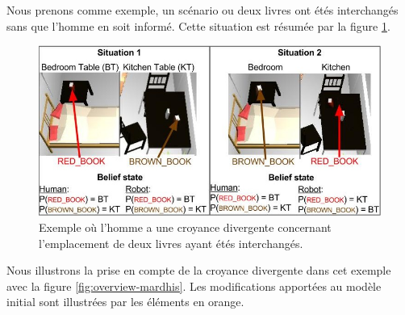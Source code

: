 \documentclass[a4paper,11pt,twoside]{StyleThese}
\begin{document}
Nous prenons comme exemple, un scénario ou deux livres ont étés interchangés sans que l'homme en soit informé.
Cette situation est résumée par la figure \ref{fig:dbexemple}.

\begin{figure}[ht!]
 \centering
  \includegraphics[width=0.89\linewidth]{./img/dbexemple.jpg} 
  \caption {Exemple où l'homme a une croyance divergente concernant l'emplacement de deux livres ayant étés interchangés.}
  \label{fig:dbexemple}
\end{figure}


Nous illustrons la prise en compte de la croyance divergente dans cet exemple avec la figure \ref{fig:overview-mardhis}. Les modifications apportées au modèle initial sont illustrées par les éléments en
orange.
\end{document}
